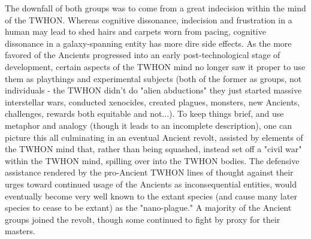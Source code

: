 The downfall of both groups was to come from a great indecision within
the mind of the TWHON. Whereas cognitive dissonance, indecision and
frustration in a human may lead to shed hairs and carpets worn from
pacing, cognitive dissonance in a galaxy-spanning entity has more dire
side effects. As the more favored of the Ancients progressed into an
early post-technological stage of development, certain aspects of the
TWHON mind no longer saw it proper to use them as playthings and
experimental subjects (both of the former as groups, not individuals -
the TWHON didn't do "alien abductions" they just started massive
interstellar wars, conducted xenocides, created plagues, monsters, new
Ancients, challenges, rewards both equitable and not...). To keep
things brief, and use metaphor and analogy (though it leads to an
incomplete description), one can picture this all culminating in an
eventual Ancient revolt, assisted by elements of the TWHON mind that,
rather than being squashed, instead set off a "civil war" within the
TWHON mind, spilling over into the TWHON bodies. The defensive
assistance rendered by the pro-Ancient TWHON lines of thought against
their urges toward continued usage of the Ancients as inconsequential
entities, would eventually become very well known to the extant
species (and cause many later species to cease to be extant) as the
"nano-plague." A majority of the Ancient groups joined the revolt,
though some continued to fight by proxy for their masters.

